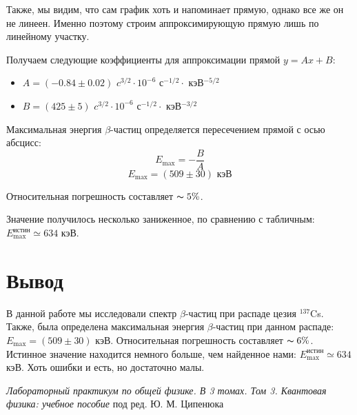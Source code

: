 \documentclass[12pt,a4paper]{article}
\begin{document}
\begin{enumerate}
		Также, мы видим, что сам график хоть и напоминает прямую, однако все же он не линеен. Именно поэтому строим аппроксимирующую прямую лишь по линейному участку.
		
		Получаем следующие коэффициенты для аппроксимации прямой $y = Ax + B$:
		\begin{itemize}
			\item $A = (-0.84 \pm 0.02)$ $c^{3/2} \cdot 10^{-6}$ с$^{-1/2} \cdot$ кэВ$^{-5/2}$
			
			\item $B = (425 \pm 5)$ $c^{3/2} \cdot 10^{-6}$ с$^{-1/2} \cdot$ кэВ$^{-3/2}$
		\end{itemize}
	
		Максимальная энергия $\beta$-частиц определяется пересечением прямой с осью абсцисс:
		\begin{equation*}
			E_\text{max} = -\frac{B}{A}
		\end{equation*}
		\begin{equation*}
			\boxed{E_\text{max} = (509 \pm 30) \text{ кэВ}}
		\end{equation*}
		
		Относительная погрешность составляет $\thicksim 5\%$.
		
		Значение получилось несколько заниженное, по сравнению с табличным: $E_\text{max}^\text{истин} \simeq 634 \text{ кэВ}$.
	\end{enumerate}



	\section*{Вывод}
    	В данной работе мы исследовали спектр $\beta$-частиц при распаде цезия $^{137}$Cs. Также, была определена максимальная энергия $\beta$-частиц при данном распаде: $E_\text{max} = (509 \pm 30)$ кэВ. Относительная погрешность составляет $\thicksim 6\%$. Истинное значение находится немного больше, чем найденное нами: $E_\text{max}^\text{истин} \simeq 634$ кэВ. Хоть ошибки и есть, но достаточно малы.

\newpage
\begin{thebibliography}{9}
	 \emph{Лабораторный практикум по общей физике. В 3 томах. Том 3. Квантовая физика: учебное пособие} под ред. Ю. М. Ципенюка
\end{thebibliography}
\end{document}
